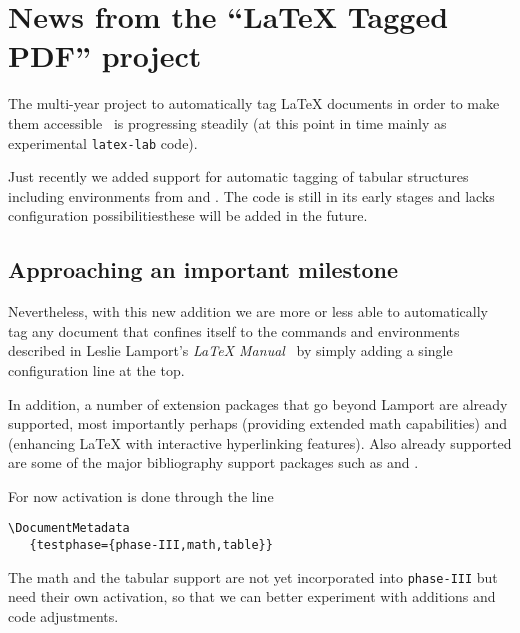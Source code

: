 \documentclass{ltnews}
\providecommand\Dash {\unskip \textemdash}
\let\finalpagebreak\pagebreak %
\providecommand\tubcommand[1]{}
\begin{document}
\tubcommand{\addtolength\textheight{4.2pc}}   %

\maketitle
{  \spaceskip=3.33pt 
\tableofcontents}

\setlength{}

\medskip



\section{News from the \enquote{\LaTeX{} Tagged PDF} project}

The multi-year project to automatically tag \LaTeX{} documents in
order to make them accessible~\cite{38:blueprint} is progressing
steadily (at this point in time mainly as experimental
\texttt{latex-lab} code).

Just recently we added support for automatic tagging of tabular
structures including environments from  and
. The code is still in its early stages and lacks
configuration possibilities\Dash these will be added in the future.

\subsection{Approaching an important milestone}

Nevertheless, with this new addition we are more or less able to
automatically tag any document that confines itself to the commands
and environments described in Leslie Lamport's \emph{\LaTeX{}
Manual}~\cite{38:Lamport} by simply adding a single configuration line
at the top.

In addition, a number of extension packages that go beyond Lamport are
already supported, most importantly perhaps  (providing
extended math capabilities) and  (enhancing \LaTeX{}
with interactive hyperlinking features).
\finalpagebreak
Also already supported are
some of the major bibliography support packages such as 
and .

For now activation is done through the line
\begin{verbatim}
\DocumentMetadata
   {testphase={phase-III,math,table}}
\end{verbatim}
The math and the tabular support are not yet incorporated into
\texttt{phase-III} but need their own activation, so that we can
better experiment with additions and code adjustments.
\end{document}

